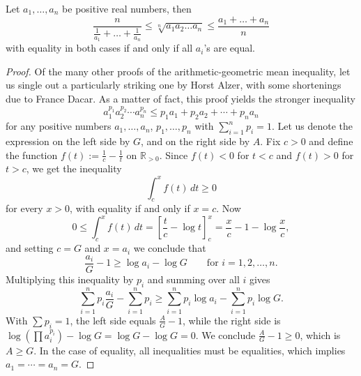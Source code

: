 \begin{theorem}
  \label{ch20theoremIIproof2}
  \leanok
  Let $a_1, \dots, a_n$ be positive real numbers, then
  \[
  \frac{n}{\frac{1}{a_1}+\dots+\frac{1}{a_n}} \le
    \sqrt[n]{a_1a_2\dots a_n} \le
    \frac{a_1+\dots+ a_n}{n}
  \]
 with equality in both cases if and only if all $a_i$'s are equal.
\end{theorem}
 \begin{proof}
  \leanok
  Of the many other proofs of the arithmetic-geometric mean inequality, let us single out
  a particularly striking one by Horst Alzer, with some shortenings due to France Dacar.
  As a matter of fact, this proof yields the stronger inequality
  \[
  a_1^{p_1} a_2^{p_2} \cdots a_n^{p_n} \le p_1 a_1 + p_2 a_2 + \cdots + p_n a_n
  \]
  for any positive numbers $a_1, \dots, a_n$, $p_1, \dots, p_n$ with $\sum_{i=1}^n p_i = 1$.
  Let us denote the expression on the left side by $G$, and on the right side by $A$.
  Fix $c > 0$ and define the function $f(t) := \frac{1}{c} - \frac{1}{t}$ on $\mathbb{R}_{>0}$.
  Since $f(t) < 0$ for $t < c$ and $f(t) > 0$ for $t > c$, we get the inequality
  \[
  \int_c^x f(t)\,dt \ge 0
  \]
  for every $x > 0$, with equality if and only if $x = c$.
  Now
  \[
  0 \le \int_c^x f(t)\,dt = \left[\frac{t}{c} - \log t\right]_c^x = \frac{x}{c} - 1 - \log\frac{x}{c},
  \]
  and setting $c = G$ and $x = a_i$ we conclude that
  \[
  \frac{a_i}{G} - 1 \ge \log a_i - \log G \qquad \text{for } i = 1, 2, \dots, n.
  \]
  Multiplying this inequality by $p_i$ and summing over all $i$ gives
  \[
  \sum_{i=1}^n p_i \frac{a_i}{G} - \sum_{i=1}^n p_i \ge \sum_{i=1}^n p_i \log a_i - \sum_{i=1}^n p_i \log G.
  \]
  With $\sum p_i = 1$, the left side equals $\frac{A}{G} - 1$, while the right side is
  $\log\left(\prod a_i^{p_i}\right) - \log G = \log G - \log G = 0$.
  We conclude $\frac{A}{G} - 1 \ge 0$, which is $A \ge G$.
  In the case of equality, all inequalities must be equalities, which implies $a_1 = \cdots = a_n = G$.
\end{proof}

